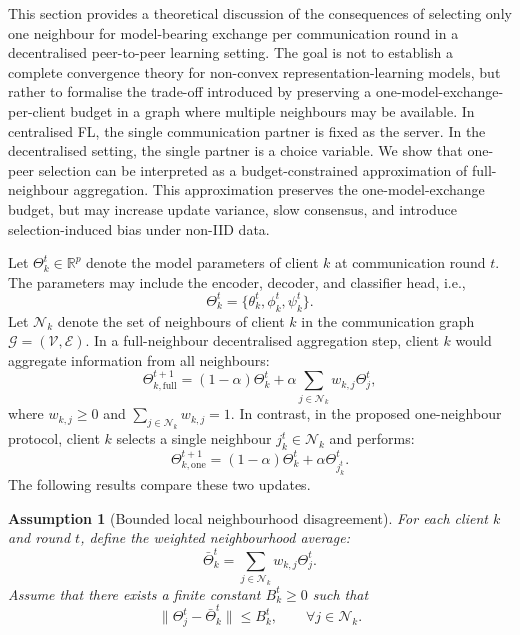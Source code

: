 \documentclass[conference]{IEEEtran}
\newtheorem{assumption}{Assumption}
\begin{document}
This section provides a theoretical discussion of the consequences of selecting only one neighbour for model-bearing exchange per communication round in a decentralised peer-to-peer learning setting. The goal is not to establish a complete convergence theory for non-convex representation-learning models, but rather to formalise the trade-off introduced by preserving a one-model-exchange-per-client budget in a graph where multiple neighbours may be available. In centralised FL, the single communication partner is fixed as the server. In the decentralised setting, the single partner is a choice variable. We show that one-peer selection can be interpreted as a budget-constrained approximation of full-neighbour aggregation. This approximation preserves the one-model-exchange budget, but may increase update variance, slow consensus, and introduce selection-induced bias under non-IID data.

Let $\Theta_k^t \in \mathbb{R}^p$ denote the model parameters of client $k$ at communication round $t$. The parameters may include the encoder, decoder, and classifier head, i.e.,
\begin{equation}
\Theta_k^t = \{\theta_k^t,\phi_k^t,\psi_k^t\}.
    \label{eq:auto-035}
\end{equation}
Let $\mathcal{N}_k$ denote the set of neighbours of client $k$ in the communication graph $\mathcal{G}=(\mathcal{V},\mathcal{E})$. In a full-neighbour decentralised aggregation step, client $k$ would aggregate information from all neighbours:
\begin{equation}
\Theta_{k,\mathrm{full}}^{t+1}
=
(1-\alpha)\Theta_k^t
+
\alpha
\sum_{j\in\mathcal{N}_k}
w_{k,j}\Theta_j^t,
    \label{eq:auto-036}
\end{equation}
where $w_{k,j}\geq 0$ and $\sum_{j\in\mathcal{N}_k}w_{k,j}=1$. In contrast, in the proposed one-neighbour protocol, client $k$ selects a single neighbour $j_k^t\in\mathcal{N}_k$ and performs:
\begin{equation}
\Theta_{k,\mathrm{one}}^{t+1}
=
(1-\alpha)\Theta_k^t
+
\alpha \Theta_{j_k^t}^t.
    \label{eq:auto-037}
\end{equation}
The following results compare these two updates.

\begin{assumption}[Bounded local neighbourhood disagreement]
\label{ass:bounded_disagreement}
For each client $k$ and round $t$, define the weighted neighbourhood average:
\begin{equation}
\bar{\Theta}_k^t
=
\sum_{j\in\mathcal{N}_k}
w_{k,j}\Theta_j^t.
    \label{eq:auto-038}
\end{equation}
Assume that there exists a finite constant $B_k^t\geq 0$ such that
\begin{equation}
\|\Theta_j^t-\bar{\Theta}_k^t\|
\leq B_k^t,
\qquad
\forall j\in\mathcal{N}_k.
    \label{eq:auto-039}
\end{equation}
\end{assumption}
\end{document}
